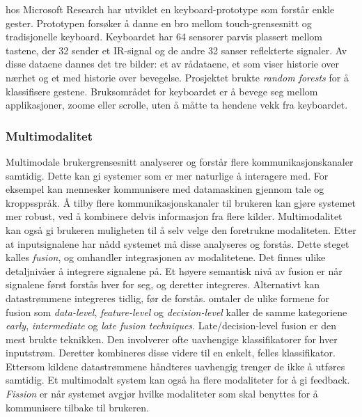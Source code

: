 \citet{96bytes} hos Microsoft Research har utviklet en keyboard-prototype som forstår enkle gester. Prototypen forsøker å danne en bro mellom touch-grensesnitt og tradisjonelle keyboard. Keyboardet har 64 sensorer parvis plassert mellom tastene, der 32 sender et IR-signal og de andre 32 sanser reflekterte signaler. Av disse dataene dannes det tre bilder: et av rådataene, et som viser historie over nærhet og et med historie over bevegelse. Prosjektet brukte \emph{random forests} for å klassifisere gestene. Bruksområdet for keyboardet er å bevege seg mellom applikasjoner, zoome eller scrolle, uten å måtte ta hendene vekk fra keyboardet.\\

\subsubsection*{Multimodalitet}
Multimodale brukergrensesnitt analyserer og forstår flere kommunikasjonskanaler samtidig. Dette kan gi systemer som er mer naturlige å interagere med. For eksempel kan mennesker kommunisere med datamaskinen gjennom tale og kroppsspråk. Å tilby flere kommunikasjonskanaler til brukeren kan gjøre systemet mer robust, ved å kombinere delvis informasjon fra flere kilder. Multimodalitet kan også gi brukeren muligheten til å selv velge den foretrukne modaliteten. Etter at inputsignalene har nådd systemet må disse analyseres og forstås. Dette steget kalles \emph{fusion}, og omhandler integrasjonen av modalitetene. Det finnes ulike detaljnivåer å integrere signalene på. Et høyere semantisk nivå av fusion er når signalene først forstås hver for seg, og deretter integreres. Alternativt kan datastrømmene integreres tidlig, før de forstås. \citet{dumas09} omtaler de ulike formene for fusion som \emph{data-level}, \emph{feature-level} og \emph{decision-level} \citet{jaimes07} kaller de samme kategoriene \emph{early}, \emph{intermediate} og \emph{late fusion techniques}. Late/decision-level fusion er den mest brukte teknikken. Den involverer ofte uavhengige klassifikatorer for hver inputstrøm. Deretter kombineres disse videre til en enkelt, felles klassifikator. Ettersom kildene datastrømmene håndteres uavhengig trenger de ikke å utføres samtidig. Et multimodalt system kan også ha flere modaliteter for å gi feedback. \emph{Fission} er når systemet avgjør hvilke modaliteter som skal benyttes for å kommunisere tilbake til brukeren.\\


